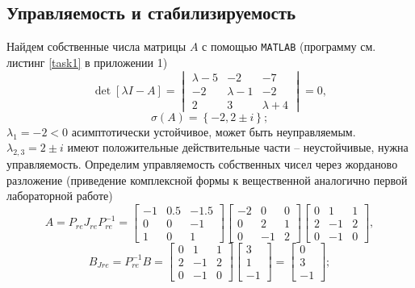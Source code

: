\documentclass[a4paper, 12pt]{article}
\begin{document}
    \subsection{Управляемость и стабилизируемость}
    Найдем собственные числа матрицы $A$ с помощью \texttt{MATLAB} (программу см. листинг \ref{task1} в приложении 1)
    $$
    \det{\left[\lambda I-A\right]}=\begin{vmatrix}
        \lambda-5 &-2 &-7\\
        -2 &\lambda-1 &-2\\
        2 &3 &\lambda+4
    \end{vmatrix}=0,
    $$
    $$
    \sigma\left(A\right)=\left\{-2, 2\pm i\right\};
    $$
    $\lambda_1=-2<0$ асимптотически устойчивое, может быть неуправляемым. $\lambda_{2,3}=2\pm i$ имеют
    положительные действительные части -- неустойчивые, нужна управляемость. Определим управляемость
    собственных чисел через жорданово разложение (приведение комплексной формы к вещественной аналогично первой
    лабораторной работе)
    $$
    A=P_{re}J_{re}P_{re}^{-1}=\begin{bmatrix}
    -1    &0.5   &-1.5\\
    0         &0   &-1\\
    1         &0    &1
    \end{bmatrix}\begin{bmatrix}
    -2     &0     &0\\
     0     &2     &1\\
     0    &-1     &2
    \end{bmatrix}\begin{bmatrix}
    0     &1     &1\\
     2    &-1     &2\\
     0    &-1     &0
    \end{bmatrix},
    $$
    $$
    B_{Jre}=P_{re}^{-1}B=\begin{bmatrix}
        0     &1     &1\\
         2    &-1     &2\\
         0    &-1     &0
        \end{bmatrix}\begin{bmatrix}
            3\\
            1\\
            -1
        \end{bmatrix}=\begin{bmatrix}
        0\\
     3\\
    -1
    \end{bmatrix};
    $$
\end{document}
